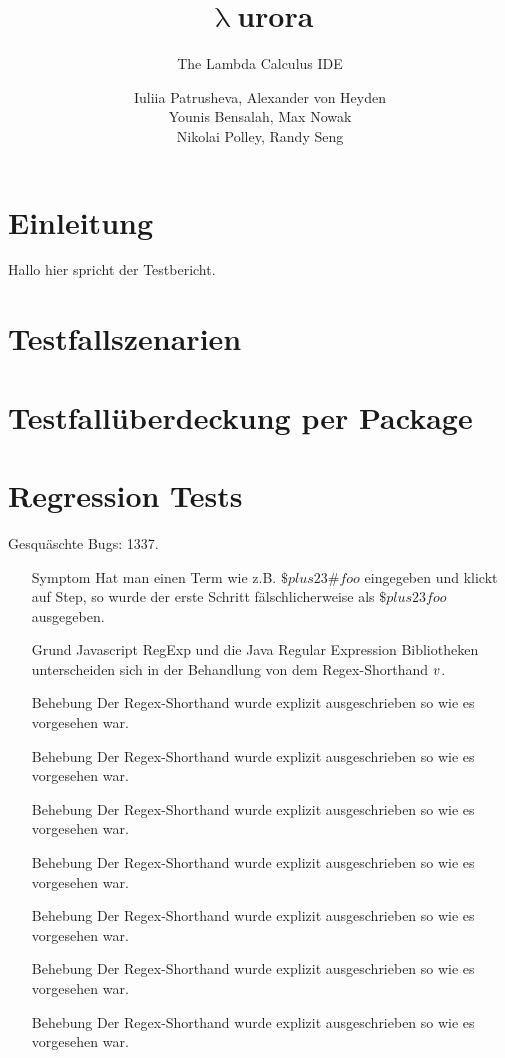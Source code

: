 \documentclass[parskip=full,11pt,twoside]{scrartcl}
\title{\textbf{$\uplambda$}urora}
\subtitle{The Lambda Calculus IDE}
\author{Iuliia Patrusheva, Alexander von Heyden\\
    Younis Bensalah, Max Nowak\\
    Nikolai Polley, Randy Seng}
\begin{document}
    \maketitle
    \tableofcontents
    \newpage

    \section{Einleitung}
    Hallo hier spricht der Testbericht.

    \section{Testfallszenarien}

    \section{Testfallüberdeckung per Package}

    \section{Regression Tests}
    Gesquäschte Bugs: 1337.

    \begin{itemize}
        \item[Symptom]
        Hat man einen Term wie z.B. $\$plus 2 3 \# foo$ eingegeben und klickt auf Step, so wurde der erste Schritt
        fälschlicherweise als $\$plus 2 3 foo$ ausgegeben.
        \item[Grund]
        Javascript RegExp und die Java Regular Expression Bibliotheken unterscheiden sich in der Behandlung von dem
        Regex-Shorthand $\\v$.
        \item[Behebung]
        Der Regex-Shorthand wurde explizit ausgeschrieben so wie es vorgesehen war.
        \item[Behebung]
        Der Regex-Shorthand wurde explizit ausgeschrieben so wie es vorgesehen war.
        \item[Behebung]
        Der Regex-Shorthand wurde explizit ausgeschrieben so wie es vorgesehen war.
        \item[Behebung]
        Der Regex-Shorthand wurde explizit ausgeschrieben so wie es vorgesehen war.
        \item[Behebung]
        Der Regex-Shorthand wurde explizit ausgeschrieben so wie es vorgesehen war.
        \item[Behebung]
        Der Regex-Shorthand wurde explizit ausgeschrieben so wie es vorgesehen war.
        \item[Behebung]
        Der Regex-Shorthand wurde explizit ausgeschrieben so wie es vorgesehen war.
    \end{itemize}
\end{document}
